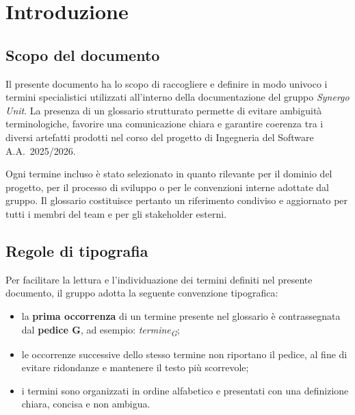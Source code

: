 \section{Introduzione}

\subsection{Scopo del documento}
Il presente documento ha lo scopo di raccogliere e definire in modo univoco i termini
specialistici utilizzati all'interno della documentazione del gruppo \textit{Synergo Unit}.
La presenza di un glossario strutturato permette di evitare ambiguità terminologiche,
favorire una comunicazione chiara e garantire coerenza tra i diversi artefatti prodotti
nel corso del progetto di Ingegneria del Software A.A.~2025/2026.

Ogni termine incluso è stato selezionato in quanto rilevante per il dominio del progetto,
per il processo di sviluppo o per le convenzioni interne adottate dal gruppo.  
Il glossario costituisce pertanto un riferimento condiviso e aggiornato per tutti i membri
del team e per gli stakeholder esterni.

\subsection{Regole di tipografia}
Per facilitare la lettura e l’individuazione dei termini definiti nel presente documento,
il gruppo adotta la seguente convenzione tipografica:

\begin{itemize}
    \item la \textbf{prima occorrenza} di un termine presente nel glossario è contrassegnata
    dal \textbf{pedice G}, ad esempio: \textit{termine\textsubscript{G}};
    \item le occorrenze successive dello stesso termine non riportano il pedice, al fine di
    evitare ridondanze e mantenere il testo più scorrevole;
    \item i termini sono organizzati in ordine alfabetico e presentati con una definizione
    chiara, concisa e non ambigua.
\end{itemize}
